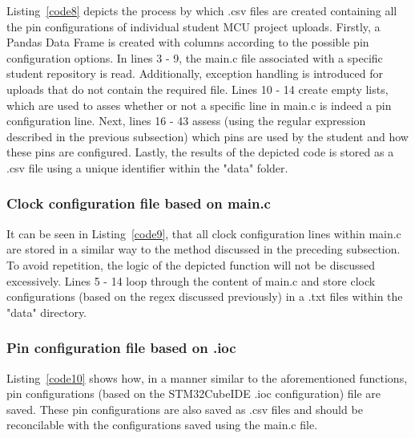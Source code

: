 Listing~\ref{code8} depicts the process by which .csv files are created containing all the pin configurations of individual student MCU project uploads. Firstly, a Pandas Data Frame is created with columns according to the possible pin configuration options. In lines 3 - 9, the main.c file associated with a specific student repository is read. Additionally, exception handling is introduced for uploads that do not contain the required file. Lines 10 - 14 create empty lists, which are used to asses whether or not a specific line in main.c is indeed a pin configuration line. Next, lines 16 - 43 assess (using the regular expression described in the previous subsection) which pins are used by the student and how these pins are configured. Lastly, the results of the depicted code is stored as a .csv file using a unique identifier within the "data" folder.
\\
\subsubsection{Clock configuration file based on main.c}
\label{cloConMain.c}


It can be seen in Listing~\ref{code9}, that all clock configuration lines within main.c are stored in a similar way to the method discussed in the preceding subsection. To avoid repetition, the logic of the depicted function will not be discussed excessively. Lines 5 - 14 loop through the content of main.c and store clock configurations (based on the regex discussed previously) in a .txt files within the "data" directory.
\\
\subsubsection{Pin configuration file based on .ioc}
\label{cloConMain.c}


Listing~\ref{code10} shows how, in a manner similar to the aforementioned functions, pin configurations (based on the STM32CubeIDE .ioc configuration) file are saved. These pin configurations are also saved as .csv files and should be reconcilable with the configurations saved using the main.c file.
\\
